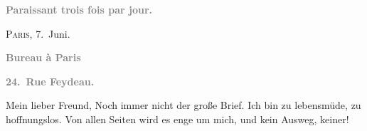 \pstart
           \begin{otherlanguage}{french}\textcolor{gray}{\textbf{\textbf{Paraissant trois fois par jour.}}}\end{otherlanguage}\hfill \textsc{Paris}, 7. Juni.\pend
           
\pstart
           \begin{otherlanguage}{french}\textcolor{gray}{\textbf{\textbf{Bureau à Paris}}}\end{otherlanguage}\pend
           
\pstart
           \begin{otherlanguage}{french}\textcolor{gray}{\textbf{\textbf{24. Rue Feydeau.}}}\end{otherlanguage}\pend
           
\pstart\center{}Mein lieber Freund,\pend\vspace{0.5em}
\pstart
           Noch immer nicht der große Brief. Ich bin zu lebensmüde, zu hoffnungslos. Von allen
               Seiten wird es enge um mich, und kein Ausweg, keiner!\pend
           
